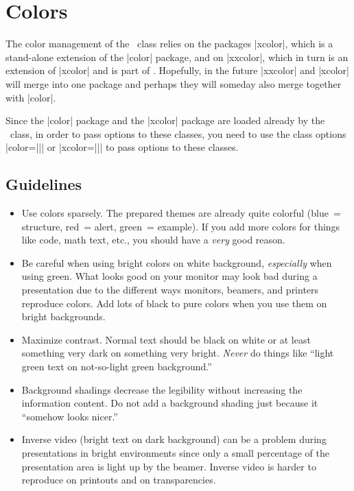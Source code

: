 %

\section{Colors}

\label{section-colors}


The color management of the \beamer\ class relies on the packages
|xcolor|, which is a stand-alone extension of the |color| package, 
and on |xxcolor|, which in turn is an extension of
|xcolor| and is part of \pgf. Hopefully, in the future |xxcolor| and
|xcolor| will merge into one package and perhaps they will
someday also merge together with |color|.

Since the |color| package and the |xcolor| package are loaded already
by the \beamer\ class, in order to pass options to these classes, you
need to use the class options |color={||}| or
|xcolor={||}| to pass options to these
classes.




\subsection{Guidelines}

\begin{itemize}
\item
  Use colors sparsely. The prepared themes are already quite
  colorful (blue~= structure, red~= alert, green~= example). If you
  add more colors for things like code, math text, etc., you should
  have a \emph{very} good reason. 
\item
  Be careful when using bright colors on white background,
  \emph{especially} when using green. What looks good on your monitor
  may look bad during a presentation due to the different ways
  monitors, beamers, and printers reproduce colors. Add lots of black
  to pure colors when you use them on bright backgrounds.
\item
  Maximize contrast. Normal text should be black on white or at least
  something very dark on something very bright. \emph{Never} do things
  like ``light green text on not-so-light green background.''
\item
  Background shadings decrease the legibility without increasing the
  information content. Do not add a background shading just because it
  ``somehow looks nicer.'' 
\item
  Inverse video (bright text on dark background) can be a problem
  during presentations in bright environments since only a small
  percentage of the presentation area is light up by the
  beamer. Inverse video is harder to reproduce on printouts and on
  transparencies. 
\end{itemize}



